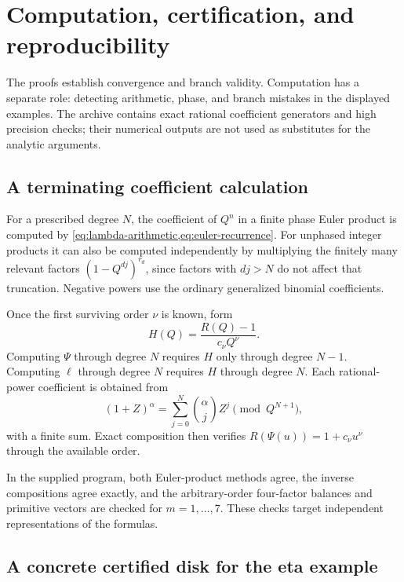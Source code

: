 \section{Computation, certification, and reproducibility}
\label{sec:verification}

The proofs establish convergence and branch validity.  Computation has
a separate role: detecting arithmetic, phase, and branch mistakes in
the displayed examples.  The archive contains exact rational
coefficient generators and high precision checks; their numerical
outputs are not used as substitutes for the analytic arguments.

\subsection{A terminating coefficient calculation}

For a prescribed degree \(N\), the coefficient of \(Q^n\) in
a finite phase Euler product is computed by
\cref{eq:lambda-arithmetic,eq:euler-recurrence}.
For unphased integer products it can also be computed independently
by multiplying the finitely many relevant factors
\((1-Q^{dj})^{r_d}\), since factors with \(dj>N\) do not affect
that truncation.  Negative powers use the ordinary generalized
binomial coefficients.

Once the first surviving order \(\nu\) is known, form
\[
 H(Q)=\frac{R(Q)-1}{c_\nu Q^\nu}.
\]
Computing \(\Psi\) through degree \(N\) requires \(H\) only
through degree \(N-1\).  Computing \(\ell\) through degree \(N\)
requires \(H\) through degree \(N\).
Each rational-power coefficient is obtained from
\[
 (1+Z)^\alpha
 =\sum_{j=0}^N\binom{\alpha}{j}Z^j
 \pmod{Q^{N+1}},
\]
with a finite sum.
Exact composition then verifies
\(R(\Psi(u))=1+c_\nu u^\nu\) through the available order.

In the supplied program, both Euler-product methods agree,
the inverse compositions agree exactly, and the arbitrary-order
four-factor balances and primitive vectors are checked for
\(m=1,\ldots,7\).
These checks target independent representations of the formulas.

\subsection{A concrete certified disk for the eta example}

